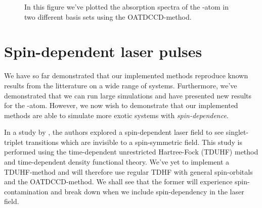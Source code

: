         \begin{figure}
            \centering
            \caption{In this figure we've plotted the absorption spectra of the
            -atom in two different basis sets using the OATDCCD-method.}
            \label{fig:ar-spectra}
        \end{figure}

    \section{Spin-dependent laser pulses}
        We have so far demonstrated that our implemented methods reproduce known
        results from the litterature on a wide range of systems.
        Furthermore, we've demonstrated that we can run large simulations and
        have presented new results for the -atom.
        However, we now wish to demonstrate that our implemented methods are
        able to simulate more exotic systems with \emph{spin-dependence}.

        In a study by \citeauthor{isborn} \cite{isborn}, the authors explored a
        spin-dependent laser field to see singlet-triplet transitions which are
        invisible to a spin-symmetric field.
        This study is performed using the time-dependent unrestricted
        Hartree-Fock (TDUHF) method and time-dependent density functional theory.
        We've yet to implement a TDUHF-method and will therefore use regular
        TDHF with general spin-orbitals and the OATDCCD-method.
        We shall see that the former will experience spin-contamination and
        break down when we include spin-dependency in the laser field.

